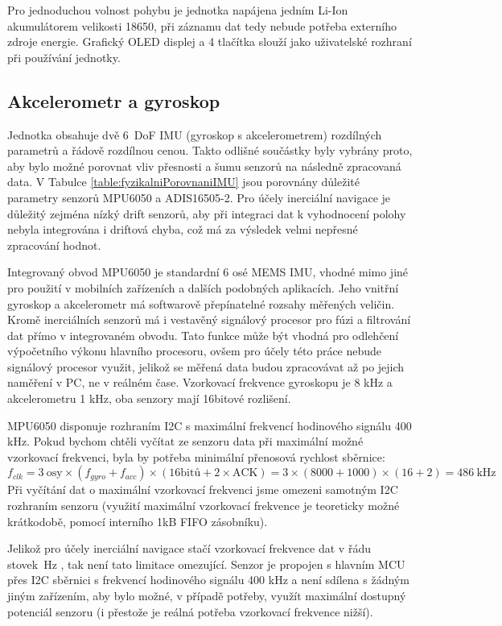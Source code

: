 Pro jednoduchou volnost pohybu je jednotka napájena jedním Li-Ion akumulátorem velikosti 18650, při záznamu dat tedy nebude potřeba externího zdroje energie. Grafický OLED displej a 4 tlačítka slouží jako uživatelské rozhraní při používání jednotky.

\subsection{Akcelerometr a gyroskop} \label{AccGyroText}
Jednotka obsahuje dvě 6~DoF IMU (gyroskop s akcelerometrem) rozdílných parametrů a řádově rozdílnou cenou. Takto odlišné součástky byly vybrány proto, aby bylo možné porovnat vliv přesnosti a šumu senzorů na následně zpracovaná data.
V Tabulce \ref{table:fyzikalniPorovnaniIMU} jsou porovnány důležité parametry senzorů MPU6050 a ADIS16505-2. Pro účely inerciální navigace je důležitý zejména nízký drift senzorů, aby při integraci dat k vyhodnocení polohy nebyla integrována i driftová chyba, což má za výsledek velmi nepřesné zpracování hodnot.



Integrovaný obvod MPU6050 je standardní 6 osé MEMS IMU, vhodné mimo jiné pro použití v mobilních zařízeních a dalších podobných aplikacích. Jeho vnitřní gyroskop a akcelerometr má softwarově přepínatelné rozsahy měřených veličin. Kromě inerciálních senzorů má i vestavěný signálový procesor pro fúzi a filtrování dat přímo v integrovaném obvodu. Tato funkce může být vhodná pro odlehčení výpočetního výkonu hlavního procesoru, ovšem pro účely této práce nebude signálový procesor využit, jelikož se měřená data budou zpracovávat až po jejich naměření v PC, ne v reálném čase. Vzorkovací frekvence gyroskopu je 8 kHz a akcelerometru 1 kHz, oba senzory mají 16bitové rozlišení.
\cite{euxR3Yh5ol4JWNAi}

MPU6050 disponuje rozhraním I2C s maximální frekvencí hodinového signálu 400 kHz. \cite{euxR3Yh5ol4JWNAi}
Pokud bychom chtěli vyčítat ze senzoru data při maximální možné vzorkovací frekvenci, byla by potřeba minimální přenosová rychlost sběrnice:
$$ f_{clk}=3~\mathrm{osy} \times(f_{gyro} + f_{acc})\times (\mathrm{16bitů} + 2 \times \mathrm{ACK})=3\times(8000+1000)\times(16+2)=\SI{486}{\kilo\hertz}$$
Při vyčítání dat o maximální vzorkovací frekvenci jsme omezeni samotným I2C rozhraním senzoru (využití maximální vzorkovací frekvence je teoreticky možné krátkodobě, pomocí interního 1kB FIFO zásobníku).\cite{euxR3Yh5ol4JWNAi}

Jelikož pro účely inerciální navigace stačí vzorkovací frekvence dat v  řádu stovek~Hz \cite{Wei2022}, tak není tato limitace omezující. Senzor je propojen s hlavním MCU přes I2C sběrnici s frekvencí hodinového signálu 400 kHz a není sdílena s žádným jiným zařízením, aby bylo možné, v případě potřeby, využít maximální dostupný potenciál senzoru (i přestože je reálná potřeba vzorkovací frekvence nižší).

